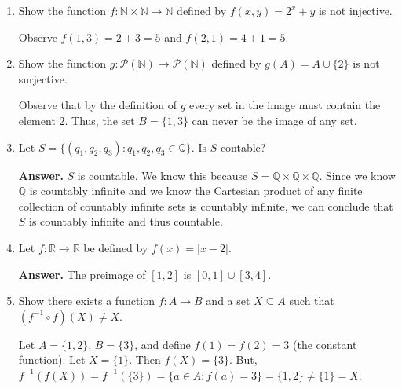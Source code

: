 \documentclass[11pt]{article}
\newcommand{\R}{{\mathbb{R}}}
\newcommand{\Q}{{\mathbb{Q}}}
\newcommand{\N}{{\mathbb{N}}}
\begin{document}
\begin{enumerate}
\begin{enumerate}
\medskip

\item Show the function $f:\N\times\N\to\N$ defined by $f(x,y)=2^x+y$ is not injective.

\medskip
Observe $f(1,3)=2+3=5$ {and} $f(2,1)=4+1=5.$

\medskip

\item Show the function $g:\mathcal{P}(\N)\to\mathcal{P}(\N)$ defined by $g(A)=A\cup\{2\}$ is not surjective.

\medskip

Observe that by the definition of $g$ every set in the image must contain the element $2$. Thus, the set $B=\{1,3\}$ can never be the image of any set.
\medskip

\item Let $S=\{(q_1,q_2,q_3): q_1,q_2,q_3\in\Q\}$. Is $S$ contable?

\medskip
\textbf{Answer.} $S$ is countable. We know this because $S=\Q\times\Q\times\Q.$ Since we know $\Q$ is countably infinite and we know the Cartesian product of any finite collection of countably infinite sets is countably infinite, we can conclude that $S$ is countably infinite and thus countable.
\medskip

\item Let $f:\R\to\R$ be defined by $f(x)=|x-2|$.

\medskip
\textbf{Answer.} The preimage of $[1,2]$ is $[0,1]\cup[3,4]$.

\medskip
\item Show there exists a function $f:A\to B$ and a set $X\subseteq A$ such that $(f^{-1}\circ f)(X)\neq X$.

\medskip

Let $A=\{1,2\}$, $B=\{3\}$, and define $f(1)=f(2)=3$ (the constant function).
Let $X=\{1\}$.
Then $f(X)=\{3\}.$ But, $f^{-1}(f(X))=f^{-1}(\{3\})=\{a\in A: f(a)=3\}=\{1,2\} \neq \{1\}=X.$


\end{enumerate}

\end{enumerate}
\end{document}
